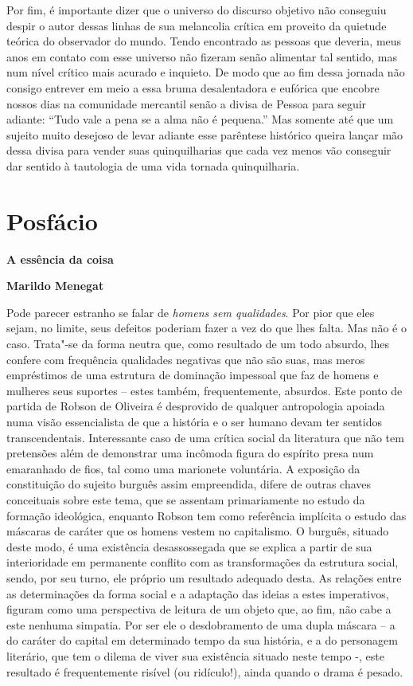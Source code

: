 Por fim, é importante dizer que o universo do discurso objetivo não
conseguiu despir o autor dessas linhas de sua melancolia crítica em
proveito da quietude teórica do observador do mundo. Tendo encontrado as
pessoas que deveria, meus anos em contato com esse universo não fizeram
senão alimentar tal sentido, mas num nível crítico mais acurado e
inquieto. De modo que ao fim dessa jornada não consigo entrever em meio
a essa bruma desalentadora e eufórica que encobre nossos dias na
comunidade mercantil senão a divisa de Pessoa para seguir adiante:
``Tudo vale a pena se a alma não é pequena.'' Mas somente até que um
sujeito muito desejoso de levar adiante esse parêntese histórico queira
lançar mão dessa divisa para vender suas quinquilharias que cada vez
menos vão conseguir dar sentido à tautologia de uma vida tornada
quinquilharia.

\chapter{Posfácio}

\textbf{A essência da coisa}

\textbf{Marildo Menegat}

Pode parecer estranho se falar de \emph{homens sem qualidades}. Por pior
que eles sejam, no limite, seus defeitos poderiam fazer a vez do que
lhes falta. Mas não é o caso. Trata"-se da forma neutra que, como
resultado de um todo absurdo, lhes confere com frequência qualidades
negativas que não são suas, mas meros empréstimos de uma estrutura de
dominação impessoal que faz de homens e mulheres seus suportes -- estes
também, frequentemente, absurdos. Este ponto de partida de Robson de
Oliveira é desprovido de qualquer antropologia apoiada numa visão
essencialista de que a história e o ser humano devam ter sentidos
transcendentais. Interessante caso de uma crítica social da literatura
que não tem pretensões além de demonstrar uma incômoda figura do
espírito presa num emaranhado de fios, tal como uma marionete
voluntária. A exposição da constituição do sujeito burguês assim
empreendida, difere de outras chaves conceituais sobre este tema, que se
assentam primariamente no estudo da formação ideológica, enquanto Robson
tem como referência implícita o estudo das máscaras de caráter que os
homens vestem no capitalismo. O burguês, situado deste modo, é uma
existência desassossegada que se explica a partir de sua interioridade
em permanente conflito com as transformações da estrutura social, sendo,
por seu turno, ele próprio um resultado adequado desta. As relações
entre as determinações da forma social e a adaptação das ideias a estes
imperativos, figuram como uma perspectiva de leitura de um objeto que,
ao fim, não cabe a este nenhuma simpatia. Por ser ele o desdobramento de
uma dupla máscara -- a do caráter do capital em determinado tempo da sua
história, e a do personagem literário, que tem o dilema de viver sua
existência situado neste tempo -, este resultado é frequentemente
risível (ou ridículo!), ainda quando o drama é pesado.

